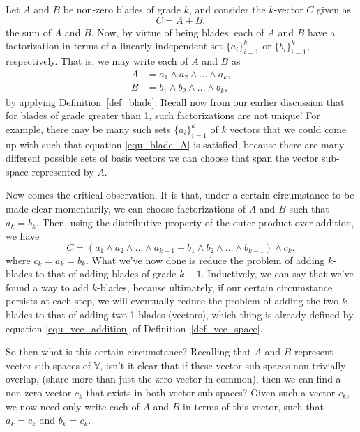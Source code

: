\documentclass[12pt]{article}
\newcommand{\V}{\mathbb{V}}
\begin{document}
Let $A$ and $B$ be non-zero blades of grade $k$, and consider the $k$-vector
$C$ given as
\begin{equation}
C = A + B,
\end{equation}
the sum of $A$ and $B$.  Now, by virtue of being blades, each of
$A$ and $B$ have a factorization in terms of a
linearly independent set $\{a_i\}_{i=1}^k$ or $\{b_i\}_{i=1}^k$,
respectively.  That is, we may write each of $A$ and $B$ as
\begin{align}
A &= a_1\wedge a_2\wedge\dots\wedge a_k, \label{equ_blade_A}\\
B &= b_1\wedge b_2\wedge\dots\wedge b_k,\label{equ_blade_B}
\end{align}
by applying Definition~\ref{def_blade}.
Recall now from our earlier discussion that for blades of grade greater than 1,
such factorizations are not unique!
For example, there may be many such sets $\{a_i\}_{i=1}^k$ of $k$ vectors
that we could come up with such that equation \eqref{equ_blade_A} is satisfied,
because there are many different possible sets of basis vectors we can choose that
span the vector sub-space represented by $A$.

Now comes the critical observation.  It is that, under a certain circumstance to
be made clear momentarily, we
can choose factorizations of $A$ and $B$ such that $a_k=b_k$.  Then, using
the distributive property of the outer product over addition, we have
\begin{equation}
C = (a_1\wedge a_2\wedge\dots\wedge a_{k-1}+b_1\wedge b_2\wedge\dots\wedge b_{k-1})\wedge c_k,
\end{equation}
where $c_k=a_k=b_k$.  What we've now done is reduce the problem of adding
$k$-blades to that of adding blades of grade $k-1$.  Inductively, we can say that we've
found a way to add $k$-blades, because ultimately, if our certain circumstance persists at each step,
we will eventually reduce the problem of adding the two $k$-blades to that
of adding two 1-blades (vectors), which thing is already defined by equation
\eqref{equ_vec_addition} of Definition~\ref{def_vec_space}.

So then what is this certain circumstance?  Recalling that $A$ and $B$ represent
vector sub-spaces of $\V$, isn't it clear that if these vector sub-spaces
non-trivially overlap, (share more than just the zero vector in common), then we can find
a non-zero vector $c_k$ that exists in both vector sub-spaces?  Given such a
vector $c_k$, we now need only write each of $A$ and $B$ in terms of this
vector, such that $a_k=c_k$ and $b_k=c_k$.
\end{document}
